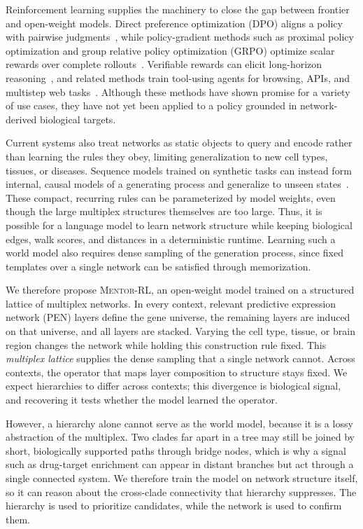 \documentclass[thesis,letterpaper,12pt]{utthesis}
\begin{document}
Reinforcement learning supplies the machinery to close the gap between frontier and open-weight models. Direct preference optimization (DPO) aligns a policy with pairwise judgments~\cite{christiano2017rlhf, ouyang2022instructgpt, dpo}, while policy-gradient methods such as proximal policy optimization and group relative policy optimization (GRPO) optimize scalar rewards over complete rollouts~\cite{schulman2017proximal, shao2024deepseekmath}. Verifiable rewards can elicit long-horizon reasoning~\cite{guo2025deepseek}, and related methods train tool-using agents for browsing, APIs, and multistep web tasks~\cite{nakano2021webgpt, qin2023toolllm, putta2024agent}. Although these methods have shown promise for a variety of use cases, they have not yet been applied to a policy grounded in network-derived biological targets.

Current systems also treat networks as static objects to query and encode rather than learning the rules they obey, limiting generalization to new cell types, tissues, or diseases. Sequence models trained on synthetic tasks can instead form internal, causal models of a generating process and generalize to unseen states~\cite{othellogpt}. These compact, recurring rules can be parameterized by model weights, even though the large multiplex structures themselves are too large. Thus, it is possible for a language model to learn network structure while keeping biological edges, walk scores, and distances in a deterministic runtime. Learning such a world model also requires dense sampling of the generation process, since fixed templates over a single network can be satisfied through memorization.

We therefore propose \textsc{Mentor-RL}, an open-weight model trained on a structured lattice of multiplex networks. In every context, relevant predictive expression network (PEN) layers define the gene universe, the remaining layers are induced on that universe, and all layers are stacked. Varying the cell type, tissue, or brain region changes the network while holding this construction rule fixed. This \textit{multiplex lattice} supplies the dense sampling that a single network cannot. Across contexts, the operator that maps layer composition to structure stays fixed. We expect hierarchies to differ across contexts; this divergence is biological signal, and recovering it tests whether the model learned the operator.

However, a hierarchy alone cannot serve as the world model, because it is a lossy abstraction of the multiplex. Two clades far apart in a tree may still be joined by short, biologically supported paths through bridge nodes, which is why a signal such as drug-target enrichment can appear in distant branches but act through a single connected system. We therefore train the model on network structure itself, so it can reason about the cross-clade connectivity that hierarchy suppresses. The hierarchy is used to prioritize candidates, while the network is used to confirm them.
\end{document}
